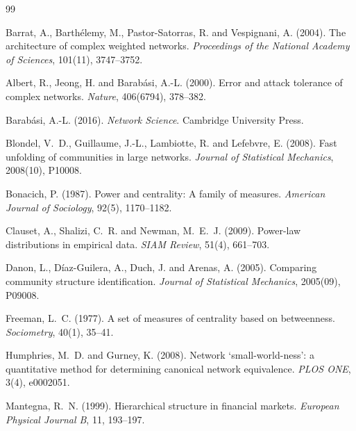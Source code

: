 \documentclass[11pt, a4paper]{article}
\begin{document}
\begin{thebibliography}{99}

Barrat, A., Barth\'elemy, M., Pastor-Satorras, R. and Vespignani, A. (2004).
\newblock The architecture of complex weighted networks.
\newblock \emph{Proceedings of the National Academy of Sciences}, 101(11), 3747--3752.

Albert, R., Jeong, H. and Barab\'asi, A.-L. (2000).
\newblock Error and attack tolerance of complex networks.
\newblock \emph{Nature}, 406(6794), 378--382.

Barab\'asi, A.-L. (2016).
\newblock \emph{Network Science}.
\newblock Cambridge University Press.

Blondel, V.~D., Guillaume, J.-L., Lambiotte, R. and Lefebvre, E. (2008).
\newblock Fast unfolding of communities in large networks.
\newblock \emph{Journal of Statistical Mechanics}, 2008(10), P10008.

Bonacich, P. (1987).
\newblock Power and centrality: A family of measures.
\newblock \emph{American Journal of Sociology}, 92(5), 1170--1182.

Clauset, A., Shalizi, C.~R. and Newman, M.~E.~J. (2009).
\newblock Power-law distributions in empirical data.
\newblock \emph{SIAM Review}, 51(4), 661--703.

Danon, L., D\'iaz-Guilera, A., Duch, J. and Arenas, A. (2005).
\newblock Comparing community structure identification.
\newblock \emph{Journal of Statistical Mechanics}, 2005(09), P09008.

Freeman, L.~C. (1977).
\newblock A set of measures of centrality based on betweenness.
\newblock \emph{Sociometry}, 40(1), 35--41.

Humphries, M.~D. and Gurney, K. (2008).
\newblock Network `small-world-ness': a quantitative method for determining canonical network equivalence.
\newblock \emph{PLOS ONE}, 3(4), e0002051.

Mantegna, R.~N. (1999).
\newblock Hierarchical structure in financial markets.
\newblock \emph{European Physical Journal B}, 11, 193--197.


\end{thebibliography}
\end{document}
